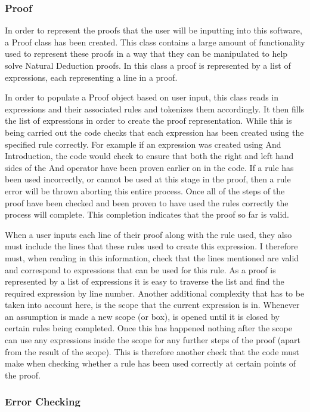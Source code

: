\subsubsection{Proof}

In order to represent the proofs that the user will be inputting into this software, a Proof class has been created. This class contains a large amount of functionality used to represent these proofs in a way that they can be manipulated to help solve Natural Deduction proofs. In this class a proof is represented by a list of expressions, each representing a line in a proof. 

In order to populate a Proof object based on user input, this class reads in expressions and their associated rules and tokenizes them accordingly. It then fills the list of expressions in order to create the proof representation. While this is being carried out the code checks that each expression has been created using the specified rule correctly. For example if an expression was created using And Introduction, the code would check to ensure that both the right and left hand sides of the And operator have been proven earlier on in the code. If a rule has been used incorrectly, or cannot be used at this stage in the proof, then a rule error will be thrown aborting this entire process. Once all of the steps of the proof have been checked and been proven to have used the rules correctly the process will complete. This completion indicates that the proof so far is valid. 

When a user inputs each line of their proof along with the rule used, they also must include the lines that these rules used to create this expression. I therefore must, when reading in this information, check that the lines mentioned are valid and correspond to expressions that can be used for this rule. As a proof is represented by a list of expressions it is easy to traverse the list and find the required expression by line number. Another additional complexity that has to be taken into account here, is the scope that the current expression is in. Whenever an assumption is made a new scope (or box), is opened until it is closed by certain rules being completed. Once this has happened nothing after the scope can use any expressions inside the scope for any further steps of the proof (apart from the result of the scope). This is therefore another check that the code must make when checking whether a rule has been used correctly at certain points of the proof.

\subsubsection{Error Checking}

